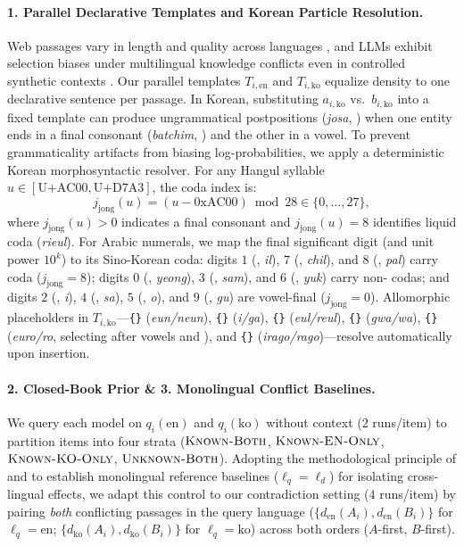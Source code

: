 \paragraph{1. Parallel Declarative Templates and Korean Particle Resolution.}
Web passages vary in length and quality across languages \citep{longpre2021mkqa,park2025investigating}, and LLMs exhibit selection biases under multilingual knowledge conflicts even in controlled synthetic contexts \citep{wu2024not}. Our parallel templates $T_{i,\text{en}}$ and $T_{i,\text{ko}}$ equalize density to one declarative sentence per passage. In Korean, substituting $a_{i,\text{ko}}$ vs.\ $b_{i,\text{ko}}$ into a fixed template can produce ungrammatical postpositions (\emph{josa}, ) when one entity ends in a final consonant (\emph{batchim}, ) and the other in a vowel. To prevent grammaticality artifacts from biasing log-probabilities, we apply a deterministic Korean morphosyntactic resolver. For any Hangul syllable $u \in [\text{U+AC00}, \text{U+D7A3}]$, the coda index is:
\begin{equation}
    j_{\text{jong}}(u) = (u - \text{0xAC00}) \bmod 28 \in \{0, \dots, 27\},
    \label{eq:batchim}
\end{equation}
where $j_{\text{jong}}(u) > 0$ indicates a final consonant and $j_{\text{jong}}(u) = 8$ identifies liquid coda  (\emph{rieul}). For Arabic numerals, we map the final significant digit (and unit power $10^k$) to its Sino-Korean coda: digits $1$ (, \emph{il}), $7$ (, \emph{chil}), and $8$ (, \emph{pal}) carry coda  ($j_{\text{jong}}{=}8$); digits $0$ (, \emph{yeong}), $3$ (, \emph{sam}), and $6$ (, \emph{yuk}) carry non- codas; and digits $2$ (, \emph{i}), $4$ (, \emph{sa}), $5$ (, \emph{o}), and $9$ (, \emph{gu}) are vowel-final ($j_{\text{jong}}{=}0$). Allomorphic placeholders in $T_{i,\text{ko}}$---\texttt{\{\}} (\emph{eun/neun}), \texttt{\{\}} (\emph{i/ga}), \texttt{\{\}} (\emph{eul/reul}), \texttt{\{\}} (\emph{gwa/wa}), \texttt{\{\}} (\emph{euro/ro}, selecting  after vowels and ), and \texttt{\{\}} (\emph{irago/rago})---resolve automatically upon insertion.

\paragraph{2. Closed-Book Prior \& 3. Monolingual Conflict Baselines.}
We query each model on $q_i(\text{en})$ and $q_i(\text{ko})$ without context ($2$ runs/item) to partition items into four strata ($\textsc{Known-Both}$, $\textsc{Known-EN-Only}$, $\textsc{Known-KO-Only}$, $\textsc{Unknown-Both}$). Adopting the methodological principle of \citet{park2025investigating} and \citet{ki2025linguistic} to establish monolingual reference baselines ($\ell_q = \ell_d$) for isolating cross-lingual effects, we adapt this control to our contradiction setting ($4$ runs/item) by pairing \emph{both} conflicting passages in the query language ($\{d_{\text{en}}(A_i), d_{\text{en}}(B_i)\}$ for $\ell_q{=}\text{en}$; $\{d_{\text{ko}}(A_i), d_{\text{ko}}(B_i)\}$ for $\ell_q{=}\text{ko}$) across both orders ($A$-first, $B$-first).

